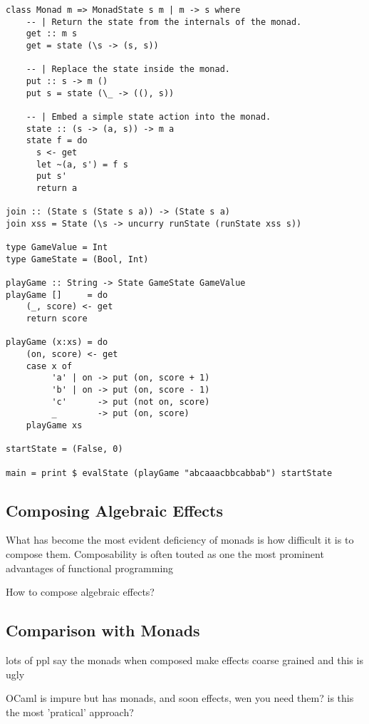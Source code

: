 \begin{verbatim}
class Monad m => MonadState s m | m -> s where
    -- | Return the state from the internals of the monad.
    get :: m s
    get = state (\s -> (s, s))

    -- | Replace the state inside the monad.
    put :: s -> m ()
    put s = state (\_ -> ((), s))

    -- | Embed a simple state action into the monad.
    state :: (s -> (a, s)) -> m a
    state f = do
      s <- get
      let ~(a, s') = f s
      put s'
      return a

join :: (State s (State s a)) -> (State s a)
join xss = State (\s -> uncurry runState (runState xss s))

type GameValue = Int
type GameState = (Bool, Int)

playGame :: String -> State GameState GameValue
playGame []     = do
    (_, score) <- get
    return score

playGame (x:xs) = do
    (on, score) <- get
    case x of
         'a' | on -> put (on, score + 1)
         'b' | on -> put (on, score - 1)
         'c'      -> put (not on, score)
         _        -> put (on, score)
    playGame xs

startState = (False, 0)

main = print $ evalState (playGame "abcaaacbbcabbab") startState
\end{verbatim}

\begin{example}
\end{example}

\subsection{Composing Algebraic Effects}
What has become the most evident deficiency of monads is
how difficult it is to compose them.
Composability is often touted as one the most
prominent advantages of functional programming

How to compose algebraic effects?
\begin{example}
\end{example}

\subsection{Comparison with Monads}
lots of ppl say the monads when composed make effects coarse grained
and this is ugly

OCaml is impure but has monads, and soon effects, wen you need them?
is this the most 'pratical' approach?

